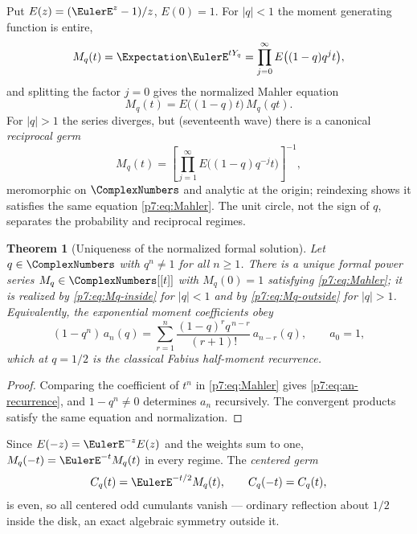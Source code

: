 \documentclass[11pt,oneside]{article}
\numberwithin{equation}{section}
\newtheorem{theorem}{Theorem}[section]
\theoremstyle{definition}
\theoremstyle{remark}
\begin{document}
Put $E(z)=(\EulerE^z-1)/z$, $E(0)=1$.  For $|q|<1$ the moment generating function
is entire,
\begin{equation}\label{p7:eq:Mq-inside}
 M_q(t)=\Expectation\EulerE^{tY_q}
 =\prod_{j=0}^{\infty}E\bigl((1-q)q^jt\bigr),
\end{equation}
and splitting the factor $j=0$ gives the normalized Mahler equation
\begin{equation}\label{p7:eq:Mahler}
 \boxed{\,M_q(t)=E\bigl((1-q)t\bigr)\,M_q(qt).\,}
\end{equation}
For $|q|>1$ the series diverges, but (seventeenth wave) there is a canonical
\emph{reciprocal germ}
\begin{equation}\label{p7:eq:Mq-outside}
 M_q(t)=
 \left[\prod_{j=1}^{\infty}E\bigl((1-q)q^{-j}t\bigr)\right]^{-1},
\end{equation}
meromorphic on $\ComplexNumbers$ and analytic at the origin; reindexing shows it satisfies
the same equation \eqref{p7:eq:Mahler}.  The unit circle, not the sign of
$q$, separates the probability and reciprocal regimes.

\begin{theorem}[Uniqueness of the normalized formal solution]
\label{p7:thm:formal-unique}
Let $q\in\ComplexNumbers$ with $q^n\ne1$ for all $n\ge1$.  There is a unique formal power
series $M_q\in\ComplexNumbers[[t]]$ with $M_q(0)=1$ satisfying \eqref{p7:eq:Mahler}; it is
realized by \eqref{p7:eq:Mq-inside} for $|q|<1$ and by
\eqref{p7:eq:Mq-outside} for $|q|>1$.  Equivalently, the exponential moment
coefficients obey
\begin{equation}\label{p7:eq:an-recurrence}
 (1-q^n)\,a_n(q)=
 \sum_{r=1}^{n}\frac{(1-q)^rq^{\,n-r}}{(r+1)!}\,a_{n-r}(q),
 \qquad a_0=1,
\end{equation}
which at $q=1/2$ is the classical Fabius half-moment recurrence.
\end{theorem}

\begin{proof}
Comparing the coefficient of $t^n$ in \eqref{p7:eq:Mahler} gives
\eqref{p7:eq:an-recurrence}, and $1-q^n\ne0$ determines $a_n$ recursively.
The convergent products satisfy the same equation and normalization.
\end{proof}

Since $E(-z)=\EulerE^{-z}E(z)$ and the weights sum to one,
$M_q(-t)=\EulerE^{-t}M_q(t)$ in every regime.  The \emph{centered germ}
\begin{equation}\label{p7:eq:Cq}
 C_q(t)=\EulerE^{-t/2}M_q(t),
 \qquad C_q(-t)=C_q(t),
\end{equation}
is even, so all centered odd cumulants vanish --- ordinary reflection about
$1/2$ inside the disk, an exact algebraic symmetry outside it.
\end{document}
